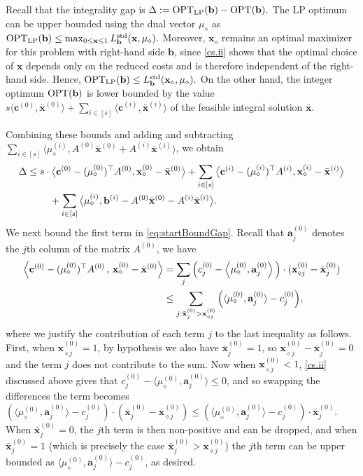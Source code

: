 \documentclass{article}
\newcommand{\av}[0]{\mathbf{a}}
\newcommand{\cv}[0]{\mathbf{c}}
\newcommand{\xv}[0]{\mathbf{x}}
\newcommand{\bv}[0]{\mathbf{b}}
\newcommand{\iprods}[2]{\langle {#1}, {#2} \rangle}
\newcommand{\iprod}[2]{\left\langle {#1}, {#2} \right\rangle}
\newcommand{\OPT}{\textup{OPT}}
\begin{document}
Recall that the integrality gap is 
$\Delta := \OPT_{\mathrm{LP}}(\bv) - \OPT(\bv).$
The LP optimum can be upper bounded using the dual vector $\mu_{\diamond}$ as
$\OPT_{\mathrm{LP}}(\bv)
\le \max_{0 \le \xv \le 1} L^{\mathrm{std}}_{\bv}(\xv,\mu_{\diamond}).$
Moreover, $\xv_{\diamond}$ remains an optimal maximizer for this problem with
right-hand side $\bv$, since \ref{cs.ii} shows that the optimal choice of $\xv$
depends only on the reduced costs and is therefore independent of the
right-hand side.
Hence,
$
\OPT_{\mathrm{LP}}(\bv)
\le L^{\mathrm{std}}_{\bv}(\xv_{\diamond},\mu_{\diamond}).
$
On the other hand, the integer optimum $\OPT(\bv)$ is lower bounded by the value
$s \langle \cv^{(0)}, \bar{\xv}^{(0)} \rangle
+ \sum_{i \in [s]} \langle \cv^{(i)}, \bar{\xv}^{(i)} \rangle$
of the feasible integral solution $\bar{\xv}$.

Combining these bounds and adding and subtracting
$\sum_{i \in [s]}
\langle \mu^{(i)}_{\diamond},
A^{(0)} \bar{\xv}^{(0)} + A^{(i)} \bar{\xv}^{(i)} \rangle$,
we obtain
\begin{align}
\Delta
\le\;
&s \cdot
\big\langle \cv^{(0)} - (\mu^{(0)}_{\diamond})^{\top} A^{(0)},
\xv^{(0)}_{\diamond} - \bar{\xv}^{(0)} \big\rangle
+ \sum_{i \in [s]}
\big\langle \cv^{(i)} - (\mu^{(i)}_{\diamond})^{\top} A^{(i)},
\xv^{(i)}_{\diamond} - \bar{\xv}^{(i)} \big\rangle \notag \\
&\quad
+ \sum_{i \in [s]}
\big\langle \mu^{(i)}_{\diamond},
\bv^{(i)} - A^{(0)} \bar{\xv}^{(0)} - A^{(i)} \bar{\xv}^{(i)} \big\rangle .
\label{eq:startBoundGap}
\end{align}
We next bound the first term in \eqref{eq:startBoundGap}. Recall that $\av^{(0)}_j$ denotes the $j$th column of the matrix $A^{(0)}$, we have
\begin{align}
    \iprod{\cv^{(0)} - (\mu^{(0)}_{\diamond})^{\top} A^{(0)}\,}{\,\xv^{(0)}_{\diamond} -\bar{\xv}^{(0)}} &= \sum_j \Big(c^{(0)}_j - \iprod{\mu_{\diamond}^{(0)}}{\av^{(0)}_j}\Big)\cdot (\xv^{(0)}_{\diamond j} - \bar{\xv}^{(0)}_j) \notag\\
    &\le  \sum_{j : \bar{\xv}^{(0)}_j > \xv^{(0)}_{\diamond j}} \Big(\langle \mu^{(0)}_{\diamond}, \av^{(0)}_j\rangle - c^{(0)}_j
 \Big),  \label{eq:gapFirstTerm}
    \end{align}
    where we justify the contribution of each term $j$ to the last inequality as follows. First, when $\xv^{(0)}_{\diamond j} = 1$, by hypothesis we also have $\bar{\xv}^{(0)}_{j} = 1$, so $\xv^{(0)}_{\diamond j} - \bar{\xv}^{(0)}_j = 0$ and the term $j$ does not contribute to the sum. Now when $\xv_{\diamond j}^{(0)} < 1$, \ref{cs.ii} discussed above gives that $c^{(0)}_j - \iprods{\mu_{\diamond}^{(0)}}{\av^{(0)}_j} \le 0$, and so swapping the differences the term becomes $(\iprods{\mu_{\diamond}^{(0)}}{\av^{(0)}_j} - c^{(0)}_j)\cdot (\bar{\xv}^{(0)}_j - \xv^{(0)}_{\diamond j}) \le (\iprods{\mu_{\diamond}^{(0)}}{\av^{(0)}_j} - c^{(0)}_j)\cdot \bar{\xv}^{(0)}_j$. When $\bar{\xv}^{(0)}_j = 0$, the $j$th term is then non-positive and can be dropped, and when $\bar{\xv}^{(0)}_j = 1$ (which is precisely the case $\bar{\xv}^{(0)}_j > \xv^{(0)}_{\diamond j}$) the $j$th term can be upper bounded as $\iprods{\mu_{\diamond}^{(0)}}{\av^{(0)}_j} - c^{(0)}_j$, as desired. 
\end{document}
